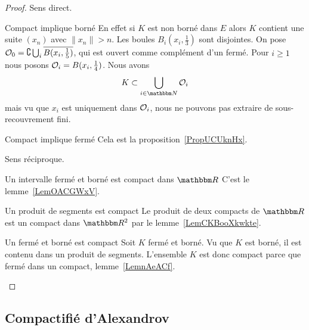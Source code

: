 \begin{proof}
    Sens direct.
    \begin{subproof}
    \item[Compact implique borné]
        En effet si \( K\) est non borné dans \( E\) alors \( K\) contient une suite \( (x_n)\) avec \( \| x_n \|>n\). Les boules \( B_i(x_i,\frac{ 1 }{3})\) sont disjointes. On pose \( \mathcal{O}_0=\complement\bigcup_i\overline{ B(x_i,\frac{1}{ 5 }) }\), qui est ouvert comme complément d'un fermé. Pour \( i\geq 1\) nous posons \( \mathcal{O}_i=B(x_i,\frac{1}{ 4 })\). Nous avons
        \begin{equation}
            K\subset\bigcup_{i\in \eN}\mO_i
        \end{equation}
        mais vu que \( x_i\) est uniquement dans \( \mathcal{O}_i\), nous ne pouvons pas extraire de sous-recouvrement fini.
    \item[Compact implique fermé]
        Cela est la proposition~\ref{PropUCUknHx}.
    \end{subproof}
    Sens réciproque.
    \begin{subproof}
    \item[Un intervalle fermé et borné est compact dans \( \eR\)]
        C'est le lemme~\ref{LemOACGWxV}.
    \item[Un produit de segments est compact]
        Le produit de deux compacts de \( \eR\) est un compact dans \( \eR^2\) par le lemme~\ref{LemCKBooXkwkte}.
    \item[Un fermé et borné est compact]
        Soit \( K\) fermé et borné. Vu que \( K\) est borné, il est contenu dans un produit de segments. L'ensemble \( K\) est donc compact parce que fermé dans un compact, lemme~\ref{LemnAeACf}.
    \end{subproof}
\end{proof}

\subsection{Compactifié d'Alexandrov}

